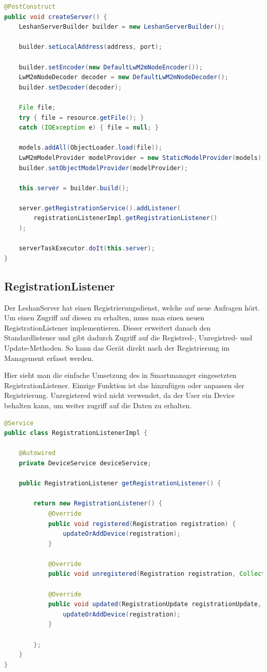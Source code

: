 \begin{lstlisting}[language=java]
@PostConstruct
public void createServer() {
	LeshanServerBuilder builder = new LeshanServerBuilder();

	builder.setLocalAddress(address, port);
		
	builder.setEncoder(new DefaultLwM2mNodeEncoder());
	LwM2mNodeDecoder decoder = new DefaultLwM2mNodeDecoder();
	builder.setDecoder(decoder);

	File file;
	try { file = resource.getFile(); } 
	catch (IOException e) { file = null; }

	models.addAll(ObjectLoader.load(file));
	LwM2mModelProvider modelProvider = new StaticModelProvider(models);
	builder.setObjectModelProvider(modelProvider);

	this.server = builder.build();
		
	server.getRegistrationService().addListener(
		registrationListenerImpl.getRegistrationListener()
	);
		
	serverTaskExecutor.doIt(this.server);
}
\end{lstlisting}
 
\subsection{RegistrationListener}
Der LeshanServer hat einen Registrierungsdienst, welche auf neue Anfragen hört. Um einen Zugriff auf diesen zu erhalten, muss man einen neuen RegistrationListener implementieren. Dieser erweitert danach den Standardlistener und gibt dadurch Zugriff auf die Registred-, Unregistred- und Update-Methoden. So kann das Gerät direkt nach der Registrierung im Management erfasst werden. 

Hier sieht man die einfache Umsetzung des in Smartmanager eingesetzten RegistrationListener. Einzige Funktion ist das hinzufügen oder anpassen der Registrierung. Unregistered wird nicht verwendet, da der User ein Device behalten kann, um weiter zugriff auf die Daten zu erhalten. 

\begin{lstlisting}[language=java]
@Service
public class RegistrationListenerImpl {

	@Autowired
	private DeviceService deviceService;

	public RegistrationListener getRegistrationListener() {

		return new RegistrationListener() {
			@Override
			public void registered(Registration registration) {
				updateOrAddDevice(registration);
			}

			@Override
			public void unregistered(Registration registration, Collection<Observation> observerColl) {}

			@Override
			public void updated(RegistrationUpdate registrationUpdate, Registration registration) {
				updateOrAddDevice(registration);
			}

		};
	}
}
\end{lstlisting}

